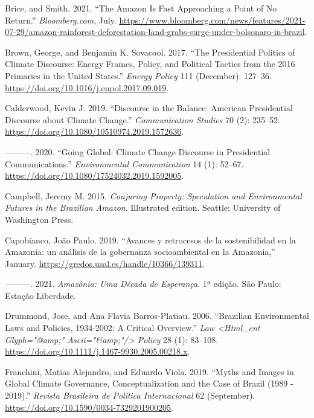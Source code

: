 \documentclass[
]{article}
\newlength{\cslhangindent}
\newlength{\cslentryspacingunit} %
\newenvironment{CSLReferences}[2] %
 {%
  \setlength{\parindent}{0pt}
  \ifodd #1
  \let\oldpar\par
  \def\par{\hangindent=\cslhangindent\oldpar}
  \fi
  \setlength{\parskip}{#2\cslentryspacingunit}
 }%
 {}
\begin{document}
\begin{CSLReferences}{1}{0}
\leavevmode{}%
Brice, and Smith. 2021. {``The Amazon Is Fast Approaching a Point of No
Return.''} \emph{Bloomberg.com}, July.
\url{https://www.bloomberg.com/news/features/2021-07-29/amazon-rainforest-deforestation-land-grabs-surge-under-bolsonaro-in-brazil}.

\leavevmode{}%
Brown, George, and Benjamin K. Sovacool. 2017. {``The Presidential
Politics of Climate Discourse: Energy Frames, Policy, and Political
Tactics from the 2016 Primaries in the United States.''} \emph{Energy
Policy} 111 (December): 127--36.
\url{https://doi.org/10.1016/j.enpol.2017.09.019}.

\leavevmode{}%
Calderwood, Kevin J. 2019. {``Discourse in the Balance: American
Presidential Discourse about Climate Change.''} \emph{Communication
Studies} 70 (2): 235--52.
\url{https://doi.org/10.1080/10510974.2019.1572636}.

\leavevmode{}%
---------. 2020. {``Going Global: Climate Change Discourse in
Presidential Communications.''} \emph{Environmental Communication} 14
(1): 52--67. \url{https://doi.org/10.1080/17524032.2019.1592005}.

\leavevmode{}%
Campbell, Jeremy M. 2015. \emph{Conjuring Property: Speculation and
Environmental Futures in the Brazilian Amazon}. Illustrated edition.
Seattle: University of Washington Press.

\leavevmode{}%
Capobianco, João Paulo. 2019. {``Avances y retrocesos de la
sostenibilidad en la Amazonia: un análisis de la gobernanza
socioambiental en la Amazonia,''} January.
\url{https://gredos.usal.es/handle/10366/139311}.

\leavevmode{}%
---------. 2021. \emph{Amazônia: Uma Década de Esperança}. 1ª edição.
São Paulo: Estação Liberdade.

\leavevmode{}%
Drummond, Jose, and Ana Flavia Barros-Platiau. 2006. {``Brazilian
Environmental Laws and Policies, 1934-2002: A Critical Overview.''}
\emph{Law \textless Html{\_}ent Glyph={"}@amp;{"}
Ascii={"}\&amp;{"}/\textgreater{} Policy} 28 (1): 83--108.
\url{https://doi.org/10.1111/j.1467-9930.2005.00218.x}.

\leavevmode{}%
Franchini, Matias Alejandro, and Eduardo Viola. 2019. {``Myths and
Images in Global Climate Governance, Conceptualization and the Case of
Brazil (1989 - 2019).''} \emph{Revista Brasileira de Política
Internacional} 62 (September).
\url{https://doi.org/10.1590/0034-7329201900205}.


\end{CSLReferences}
\end{document}
